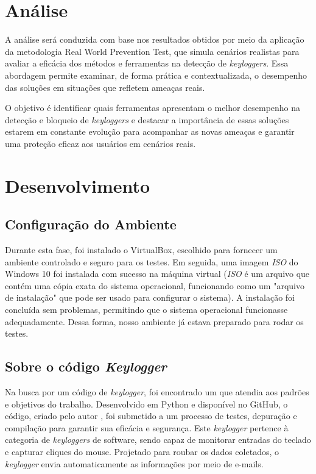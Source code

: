 \documentclass[12pt]{article}
\begin{document}
\section{Análise}
A análise será conduzida com base nos resultados obtidos por meio da aplicação da metodologia Real World Prevention Test, que simula cenários realistas para avaliar a eficácia dos métodos e ferramentas na detecção de \textit{keyloggers}. Essa abordagem permite examinar, de forma prática e contextualizada, o desempenho das soluções em situações que refletem ameaças reais.

O objetivo é identificar quais ferramentas apresentam o melhor desempenho na detecção e bloqueio de \textit{keyloggers} e destacar a importância de essas soluções estarem em constante evolução para acompanhar as novas ameaças e garantir uma proteção eficaz aos usuários em cenários reais.

\section{Desenvolvimento}

\subsection{Configuração do Ambiente}

Durante esta fase, foi instalado o VirtualBox, escolhido para fornecer um ambiente controlado e seguro para os testes. Em seguida, uma imagem \textit{ISO} do Windows 10 foi instalada com sucesso na máquina virtual (\textit{ISO} é um arquivo que contém uma cópia exata do sistema operacional, funcionando como um "arquivo de instalação" que pode ser usado para configurar o sistema). A instalação foi concluída sem problemas, permitindo que o sistema operacional funcionasse adequadamente. Dessa forma, nosso ambiente já estava preparado para rodar os testes.

\subsection{Sobre o código \textit{Keylogger}}

Na busca por um código de \textit{keylogger}, foi encontrado um que atendia aos padrões e objetivos do trabalho. Desenvolvido em Python e disponível no GitHub, o código, criado pelo autor \citep{Aydinnyunus}, foi submetido a um processo de testes, depuração e compilação para garantir sua eficácia e segurança. Este \textit{keylogger} pertence à categoria de \textit{keyloggers} de software, sendo capaz de monitorar entradas do teclado e capturar cliques do mouse. Projetado para roubar os dados coletados, o \textit{keylogger} envia automaticamente as informações por meio de e-mails.
\end{document}
